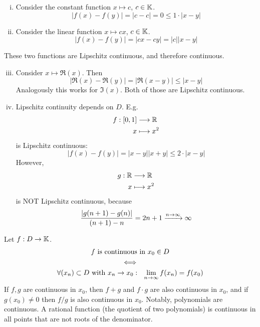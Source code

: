 \documentclass[../script.tex]{subfiles}
\begin{document}
\begin{eg}
    \begin{enumerate}[(i)]
        \item Consider the constant function $x \mapsto c$, $c \in \mathbb{K}$.
        \[
            |f(x) - f(y)| = |c - c| = 0 \le 1 \cdot |x - y|
        \]

        \item Consider the linear function $x \mapsto cx$, $c \in \mathbb{K}$.
        \[
            |f(x) - f(y)| = |cx - cy| = |c||x - y|
        \]
    \end{enumerate}
    These two functions are Lipschitz continuous, and therefore continuous.
    \begin{enumerate}[(i)]\setcounter{enumi}{2}
        \item Consider $x \mapsto \Re(x)$. Then 
        \[
            |\Re(x) - \Re(y)| = |\Re(x - y)| \le |x - y|
        \]
        Analogously this works for $\Im(x)$. Both of those are Lipschitz continuous.

        \item Lipschitz continuity depends on $D$. E.g.
        \begin{align*}
            f: [0, 1] &\longrightarrow \mathbb{R} \\
            x &\longmapsto x^2
        \end{align*}
        is Lipschitz continuous:
        \[
            |f(x) - f(y)| = |x-y||x+y| \le 2 \cdot |x - y|
        \]
        However,
        \begin{align*}
            g: \mathbb{R} &\longrightarrow \mathbb{R} \\
            x &\longmapsto x^2
        \end{align*}
        is NOT Lipschitz continuous, because 
        \[
            \frac{|g(n+1) - g(n)|}{(n+1) - n} = 2n + 1 \convinf \infty
        \]
    \end{enumerate}
\end{eg}

\begin{rem}
    Let $f: D \rightarrow \mathbb{K}$.
    \begin{gather*}
        f \text{ is continuous in } x_0 \in D \\
        \iff \\ 
        \forall (x_n) \subset D \text{ with } x_n \rightarrow x_0: ~~\lim_{n \rightarrow \infty} f(x_n) = f(x_0)   
    \end{gather*}
    If $f, g$ are continuous in $x_0$, then $f+g$ and $f \cdot g$ are also continuous in $x_0$, and if $g(x_0) \ne 0$ then $f/g$ is also continuous in $x_0$.
    Notably, polynomials are continuous. A rational function (the quotient of two polynomials) is continuous in all points that are not roots of the denominator.
\end{rem}
\end{document}
